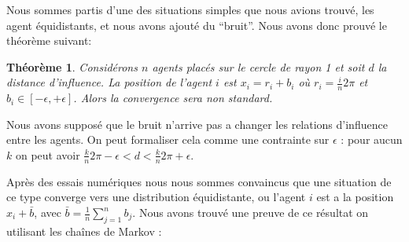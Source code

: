 ﻿\documentclass[a4paper,10pt]{report}
\newtheorem{theorem}{Théorème}
\begin{document}
Nous sommes partis d'une des situations simples que nous avions trouvé, les agent équidistants, et nous avons ajouté du ``bruit''. Nous avons donc prouvé le théorème suivant:
\begin{theorem}
Considérons $n$ agents placés sur le cercle de rayon 1 et soit $d$ la distance d'influence. La position de l'agent $i$ est $x_i = r_i + b_i$ où $r_i = \frac{i}{n} 2 \pi$ et $b_i \in [-\epsilon, +\epsilon]$. Alors la convergence sera non standard.
\end{theorem}

Nous avons supposé que le bruit n'arrive pas a changer les relations d'influence entre les agents. On peut formaliser cela comme une contrainte sur $\epsilon$ : pour aucun $k$ on peut avoir $\frac{k}{n} 2 \pi - \epsilon < d < \frac{k}{n} 2 \pi + \epsilon$.

Après des essais numériques nous nous sommes convaincus que une situation de ce type converge vers une distribution équidistante, ou l'agent $i$ est a la position $x_i + \bar b$, avec $\bar b = \frac{1}{n} \sum_{j=1}^n b_j$. Nous avons trouvé une preuve de ce résultat on utilisant les chaînes de Markov :
\end{document}
